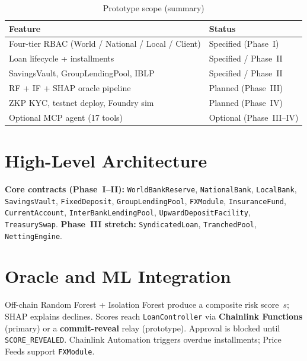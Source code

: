 \documentclass[12pt, a4paper]{report}
\newcommand{\tableheadcolor}{\rowcolor{TableHeadBg}}
\newcommand{\tableheadfont}{\bfseries}
\begin{document}
\begin{table}[H]
\centering
\caption[Prototype scope (summary)]{Prototype scope (summary)}
\label{tab:prototype-scope}
\footnotesize
\begin{tabular}{@{}p{7.2cm}>{\raggedleft\arraybackslash}p{5.5cm}@{}}
\toprule
\tableheadcolor
\tableheadfont Feature & \tableheadfont Status \\
\midrule
Four-tier RBAC (World / National / Local / Client) & Specified (Phase~I) \\
Loan lifecycle + installments & Specified / Phase~II \\
SavingsVault, GroupLendingPool, IBLP & Specified / Phase~II \\
RF + IF + SHAP oracle pipeline & Planned (Phase~III) \\
ZKP KYC, testnet deploy, Foundry sim & Planned (Phase~IV) \\
Optional MCP agent (17 tools) & Optional (Phase~III--IV) \\
\bottomrule
\end{tabular}
\end{table}

\section{High-Level Architecture}
\label{sec:high-level-arch}

\textbf{Core contracts (Phase~I--II):} \texttt{WorldBankReserve}, \texttt{NationalBank}, \texttt{LocalBank}, \texttt{SavingsVault}, \texttt{FixedDeposit}, \texttt{GroupLendingPool}, \texttt{FXModule}, \texttt{InsuranceFund}, \texttt{CurrentAccount}, \texttt{InterBankLendingPool}, \texttt{UpwardDepositFacility}, \texttt{TreasurySwap}. \textbf{Phase~III stretch:} \texttt{SyndicatedLoan}, \texttt{TranchedPool}, \texttt{NettingEngine}.

\section{Oracle and ML Integration}
\label{sec:oracle-architecture}
\label{sec:ml-explainability}
\label{sec:aiml-support}

Off-chain Random Forest + Isolation Forest produce a composite risk score~$s$; SHAP explains declines. Scores reach \texttt{LoanController} via \textbf{Chainlink Functions} (primary) or a \textbf{commit-reveal} relay (prototype). Approval is blocked until \texttt{SCORE\_REVEALED}. Chainlink Automation triggers overdue installments; Price Feeds support \texttt{FXModule}.
\end{document}
